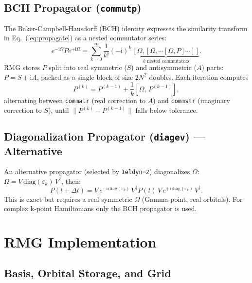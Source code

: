 \documentclass[12pt,letterpaper]{article}
\newcommand{\comm}[2]{\left[ #1,\, #2 \right]}
\newcommand{\ii}{\mathrm{i}}
\begin{document}
\subsection{BCH Propagator (\texttt{commutp})}
\label{sec:bch}

The Baker-Campbell-Hausdorff (BCH) identity expresses the similarity transform
in Eq.~(\ref{eq:propagate}) as a nested commutator series:
\begin{equation}
  e^{-\ii\Omega}P e^{+\ii\Omega}
  = \sum_{k=0}^{\infty} \frac{1}{k!}(-\ii)^k\,
    \underbrace{[\Omega,[\Omega,\cdots[\Omega,P]\cdots]]}_{k\text{ nested commutators}}.
  \label{eq:bch}
\end{equation}
RMG stores $P$ split into real symmetric ($S$) and antisymmetric ($A$) parts:
$P = S + \ii A$, packed as a single block of size $2N^2$ doubles.  Each
iteration computes
\begin{equation}
  P^{(k)} = P^{(k-1)} + \frac{1}{k}\comm{\Omega}{P^{(k-1)}},
\end{equation}
alternating between \texttt{commatr} (real correction to $A$) and
\texttt{commstr} (imaginary correction to $S$), until $\|P^{(k)}-P^{(k-1)}\|$
falls below tolerance.

\subsection{Diagonalization Propagator (\texttt{diagev}) --- Alternative}
\label{sec:diagev}

An alternative propagator (selected by \texttt{Ieldyn=2}) diagonalizes $\Omega$:
$\Omega = V\,\mathrm{diag}(\varepsilon_k)\,V^\dagger$, then:
\begin{equation}
  P(t+\Delta t) = V\,e^{-\ii\,\mathrm{diag}(\varepsilon_k)}\,V^\dagger
    P(t)\,V\,e^{+\ii\,\mathrm{diag}(\varepsilon_k)}\,V^\dagger.
\end{equation}
This is exact but requires a real symmetric $\Omega$ (Gamma-point, real
orbitals).  For complex k-point Hamiltonians only the BCH propagator is used.

\section{RMG Implementation}
\label{sec:implementation}

\subsection{Basis, Orbital Storage, and Grid}
\label{sec:impl:basis}
\end{document}
